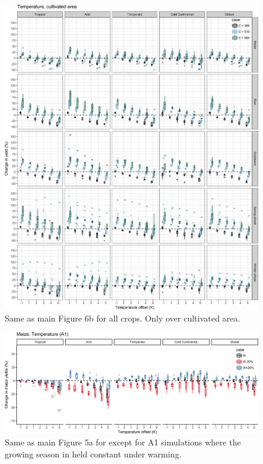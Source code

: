 \documentclass[10pt]{article}
\begin{document}
\begin{figure}[h!]
    \centering
    \includegraphics[width=\textwidth]{s_sim_CG_TC_area.png}
    \caption{Same as main Figure 6b for all crops. Only over cultivated area.}
    \label{fig:carbontemp}
\end{figure}

\begin{figure}[h!]
    \centering
    \includegraphics[width=\textwidth]{maize_sim_CG_T_A1.png}
    \caption{Same as main Figure 5a for except for A1 simulations where the growing season in held constant under warming.}
    \label{fig:carbontemp}
\end{figure}
\end{document}
